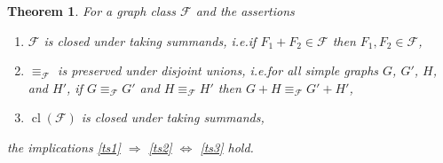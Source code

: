 \documentclass[3p,final]{elsarticle}
\DeclareMathOperator{\cl}{cl}
\newtheorem{theorem}{Theorem}
\begin{document}
	\begin{theorem}  \label{thm:taking-summands}
		For a graph class $\mathcal{F}$ and the assertions
		\begin{enumerate}
			\item $\mathcal{F}$ is \emph{closed under taking summands}, i.e.\@ if $F_1 + F_2 \in \mathcal{F}$ then $F_1, F_2 \in \mathcal{F}$,\label{ts1}
			\item $\equiv_{\mathcal{F}}$ is \emph{preserved under disjoint unions}, i.e.\@ for all simple graphs $G$, $G'$, $H$, and $H'$, if $G \equiv_{\mathcal{F}} G'$ and $H \equiv_{\mathcal{F}} H'$ then $G + H \equiv_{\mathcal{F}} G' + H'$,\label{ts2}
			\item $\cl(\mathcal{F})$ is closed under taking summands,\label{ts3}
		\end{enumerate}
		the implications \ref{ts1} $\Rightarrow$ \ref{ts2} $\Leftrightarrow$ \ref{ts3} hold.
	\end{theorem}
\end{document}

